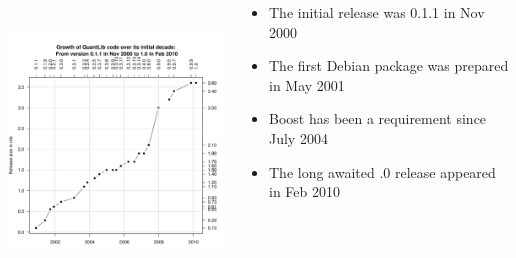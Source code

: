 \documentclass[compress]{beamer}
\begin{document}
\begin{frame}
\begin{columns}

    \begin{column}{2.9in}
      \includegraphics[height=2.9in]{figures/qlReleases.pdf}
    \end{column}
    
    \pause
    \begin{column}{2in}
      \begin{itemize}[<+-|alert@+>]
      \item The initial \QL release was 0.1.1 in Nov 2000
      \item The first Debian \QL package was prepared in May 2001
      \item Boost has been a \QL requirement since July 2004
      \item The long awaited .0 release appeared in Feb 2010
      \end{itemize}
    \end{column}
  \end{columns}
\end{frame}
\end{document}
